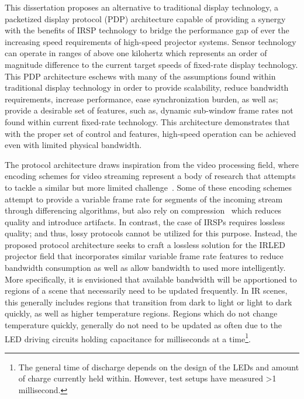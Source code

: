 This dissertation proposes an alternative to traditional display technology, a packetized display protocol (PDP) architecture capable of providing a synergy with the benefits of IRSP technology to bridge the performance gap of ever the increasing speed requirements of high-speed projector systems. Sensor technology can operate in ranges of above one kilohertz which represents an order of magnitude difference to the current target speeds of fixed-rate display technology. This PDP architecture eschews with many of the assumptions found within traditional display technology in order to provide scalability, reduce bandwidth requirements, increase performance, ease synchronization burden, as well as; provide a desirable set of features, such as, dynamic sub-window frame rates not found within current fixed-rate technology. This architecture demonstrates that with the proper set of control and features, high-speed operation can be achieved even with limited physical bandwidth.

The protocol architecture draws inspiration from the video processing field, where encoding schemes for video streaming represent a body of research that attempts to tackle a similar but more limited challenge~\cite{BakarEtAl2017}. Some of these encoding schemes attempt to provide a variable frame rate for segments of the incoming stream through differencing algorithms, but also rely on compression~\cite{CastilloEtAl2012} which reduces quality and introduce artifacts. In contrast, the case of IRSPs requires lossless quality; and thus, lossy protocols cannot be utilized for this purpose. Instead, the proposed protocol architecture seeks to craft a lossless solution for the IRLED projector field that incorporates similar variable frame rate features to reduce bandwidth consumption as well as allow bandwidth to used more intelligently. More specifically, it is envisioned that available bandwidth will be apportioned to regions of a scene that necessarily need to be updated frequently. In IR scenes, this generally includes regions that transition from dark to light or light to dark quickly, as well as higher temperature regions. Regions which do not change temperature quickly, generally do not need to be updated as often due to the LED driving circuits holding capacitance for milliseconds at a time\footnote{The general time of discharge depends on the design of the LEDs and amount of charge currently held within. However, test setups have measured \textgreater1 millisecond.}.


